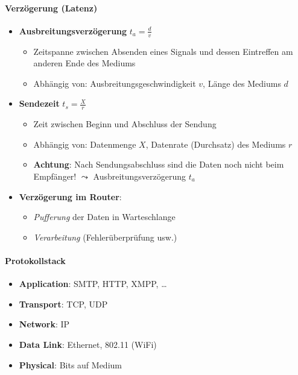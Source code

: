 \paragraph{Verzögerung (Latenz)}
\begin{itemize}
  \item \textbf{Ausbreitungsverzögerung} \( t_a = \tfrac{d}{v} \)
  \begin{itemize}
    \item Zeitspanne zwischen Absenden eines Signals und dessen Eintreffen am anderen Ende des Mediums
    \item Abhängig von: Ausbreitungsgeschwindigkeit \( v \), Länge des Mediums \( d \)
  \end{itemize}
  \item \textbf{Sendezeit} \( t_s = \tfrac{X}{r} \)
  \begin{itemize}
    \item Zeit zwischen Beginn und Abschluss der Sendung
    \item Abhängig von: Datenmenge \( X \), Datenrate (Durchsatz) des Mediums \( r \)
    \item \textbf{Achtung}: Nach Sendungsabschluss sind die Daten noch nicht beim Empfänger! \( \leadsto \) Ausbreitungsverzögerung \( t_a \)
  \end{itemize}
  \item \textbf{Verzögerung im Router}:
  \begin{itemize}
    \item \emph{Pufferung} der Daten in Warteschlange
    \item \emph{Verarbeitung} (Fehlerüberprüfung usw.)
  \end{itemize}
\end{itemize}

\paragraph{Protokollstack}
\begin{itemize}
  \item \textbf{Application}: SMTP, HTTP, XMPP, \dots
  \item \textbf{Transport}: TCP, UDP
  \item \textbf{Network}: IP
  \item \textbf{Data Link}: Ethernet, 802.11 (WiFi)
  \item \textbf{Physical}: Bits auf Medium
\end{itemize}

